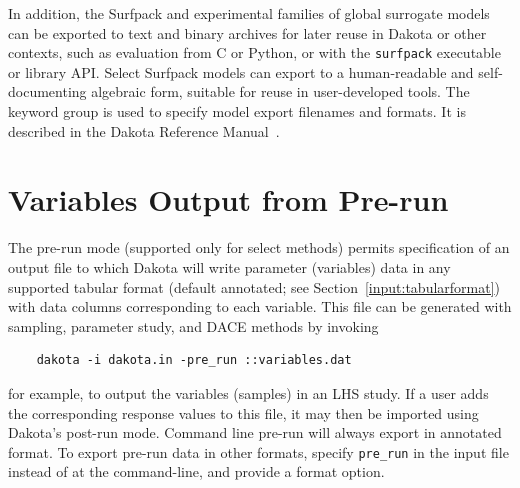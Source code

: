 In addition, the Surfpack and experimental families of global
surrogate models can be exported to text and binary archives for later
reuse in Dakota or other contexts, such as evaluation from C or
Python, or with the {\tt surfpack} executable or library API. Select
Surfpack models can export to a human-readable and self-documenting
algebraic form, suitable for reuse in user-developed tools. The
 keyword group is used to specify model export
filenames and formats. It is described in the Dakota Reference
Manual~\cite{RefMan}.

\section{Variables Output from Pre-run}

The pre-run mode (supported only for select methods) permits
specification of an output file to which Dakota will write parameter
(variables) data in any supported tabular format (default annotated; see
Section~\ref{input:tabularformat}) with data columns corresponding to
each variable.  This file can be generated with sampling, parameter
study, and DACE methods by invoking
\begin{small}
\begin{verbatim}
    dakota -i dakota.in -pre_run ::variables.dat
\end{verbatim}
\end{small}
for example, to output the variables (samples) in an LHS study.  If a
user adds the corresponding response values to this file, it may then
be imported using Dakota's post-run mode.  Command line pre-run will
always export in annotated format.  To export pre-run data in other
formats, specify \texttt{pre\_run} in the input file instead of at the
command-line, and provide a format option.

